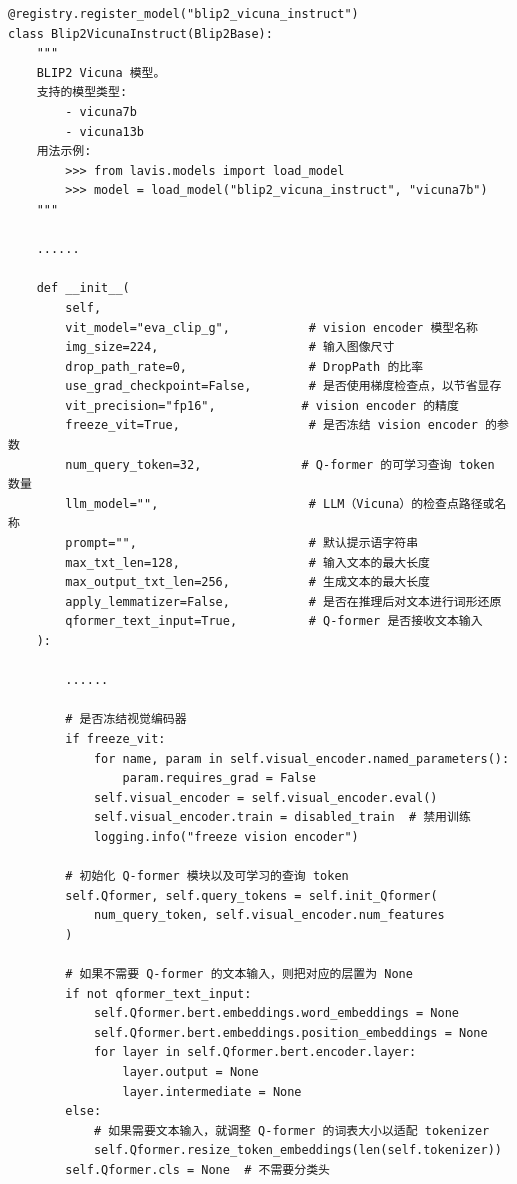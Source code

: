 \documentclass[zihao=false,fontset=windows]{ctexart}
\begin{document}
\begin{feishucode}
\begin{lstlisting}
@registry.register_model("blip2_vicuna_instruct")
class Blip2VicunaInstruct(Blip2Base):
    """
    BLIP2 Vicuna 模型。
    支持的模型类型:
        - vicuna7b
        - vicuna13b
    用法示例:
        >>> from lavis.models import load_model
        >>> model = load_model("blip2_vicuna_instruct", "vicuna7b")
    """

    ......
    
    def __init__(
        self,
        vit_model="eva_clip_g",           # vision encoder 模型名称
        img_size=224,                     # 输入图像尺寸
        drop_path_rate=0,                 # DropPath 的比率
        use_grad_checkpoint=False,        # 是否使用梯度检查点，以节省显存
        vit_precision="fp16",            # vision encoder 的精度
        freeze_vit=True,                  # 是否冻结 vision encoder 的参数
        num_query_token=32,              # Q-former 的可学习查询 token 数量
        llm_model="",                     # LLM（Vicuna）的检查点路径或名称
        prompt="",                        # 默认提示语字符串
        max_txt_len=128,                  # 输入文本的最大长度
        max_output_txt_len=256,           # 生成文本的最大长度
        apply_lemmatizer=False,           # 是否在推理后对文本进行词形还原
        qformer_text_input=True,          # Q-former 是否接收文本输入
    ):
        
        ......
        
        # 是否冻结视觉编码器
        if freeze_vit:
            for name, param in self.visual_encoder.named_parameters():
                param.requires_grad = False
            self.visual_encoder = self.visual_encoder.eval()
            self.visual_encoder.train = disabled_train  # 禁用训练
            logging.info("freeze vision encoder")

        # 初始化 Q-former 模块以及可学习的查询 token
        self.Qformer, self.query_tokens = self.init_Qformer(
            num_query_token, self.visual_encoder.num_features
        )

        # 如果不需要 Q-former 的文本输入，则把对应的层置为 None
        if not qformer_text_input:
            self.Qformer.bert.embeddings.word_embeddings = None
            self.Qformer.bert.embeddings.position_embeddings = None
            for layer in self.Qformer.bert.encoder.layer:
                layer.output = None
                layer.intermediate = None
        else:
            # 如果需要文本输入，就调整 Q-former 的词表大小以适配 tokenizer
            self.Qformer.resize_token_embeddings(len(self.tokenizer))
        self.Qformer.cls = None  # 不需要分类头


\end{lstlisting}
\end{feishucode}
\end{document}
